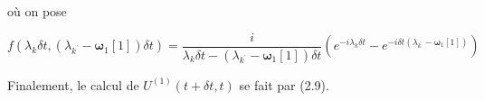 où on pose

\begin{equation}
    f(\lambda_k\delta t, (\lambda_{k^\text{'}}-\boldsymbol{\omega}_1[1])\delta t) = \frac{i}{\lambda_k\delta t - (\lambda_{k^\text{'}} - \boldsymbol{\omega}_1[1])\delta t}\left(e^{-i\lambda_k\delta t} - e^{-i\delta t(\lambda_{k^\text{'}} - \boldsymbol{\omega}_1[1])} \right) 
\end{equation}

Finalement, le calcul de $U^{(1)}(t + \delta t, t)$ se fait par (2.9).






